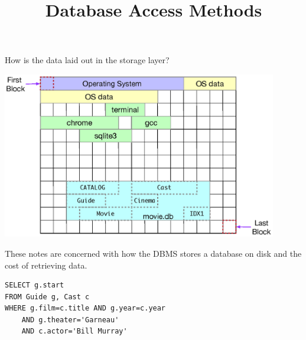 \documentclass[xcolor={usenames,dvipsnames}
    ,handout
]{beamer}
\title{Database Access Methods}
\begin{document}





\frame{\maketitle}

%
%
\begin{frame}{How is the data laid out in the storage layer?}


\begin{center}
\includegraphics[width=0.9\textwidth]{../lec03_hardware/figures/blocks_on_storage}
\end{center}

These notes are concerned with how the DBMS stores a database on disk and the cost of retrieving data.

\end{frame}


\newsavebox\lecIVsqlExampleONE
\begin{lrbox}{\lecIVsqlExampleONE}
\begin{lstlisting}[style=SQL]
SELECT g.start
FROM Guide g, Cast c
WHERE g.film=c.title AND g.year=c.year
    AND g.theater='Garneau' 
	AND c.actor='Bill Murray'
\end{lstlisting}
\end{lrbox}
\end{document}
